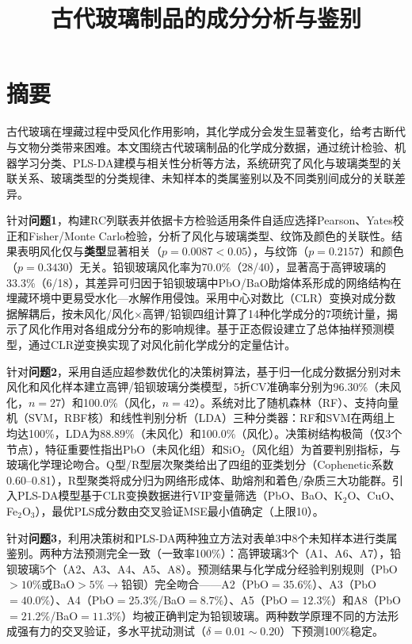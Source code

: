 \documentclass[12pt,a4paper]{ctexart}
\title{\vspace{-2.5cm}\textbf{古代玻璃制品的成分分析与鉴别}}
\author{}
\date{}
\begin{document}
\maketitle
\thispagestyle{empty}

\section*{摘\quad 要}
\thispagestyle{fancy}

古代玻璃在埋藏过程中受风化作用影响，其化学成分会发生显著变化，给考古断代与文物分类带来困难。本文围绕古代玻璃制品的化学成分数据，通过统计检验、机器学习分类、PLS-DA建模与相关性分析等方法，系统研究了风化与玻璃类型的关联关系、玻璃类型的分类规律、未知样本的类属鉴别以及不同类别间成分的关联差异。

针对\textbf{问题1}，构建RC列联表并依据卡方检验适用条件自适应选择Pearson、Yates校正和Fisher/Monte Carlo检验，分析了风化与玻璃类型、纹饰及颜色的关联性。结果表明风化仅与\textbf{类型}显著相关（$p=0.0087<0.05$），与纹饰（$p=0.2157$）和颜色（$p=0.3430$）无关。铅钡玻璃风化率为70.0\%（28/40），显著高于高钾玻璃的33.3\%（6/18），其差异可归因于铅钡玻璃中PbO/BaO助熔体系形成的网络结构在埋藏环境中更易受水化—水解作用侵蚀\cite{3}。采用中心对数比（CLR）变换对成分数据解耦后，按未风化/风化$\times$高钾/铅钡四组计算了14种化学成分的7项统计量，揭示了风化作用对各组成分分布的影响规律。基于正态假设建立了总体抽样预测模型，通过CLR逆变换实现了对风化前化学成分的定量估计。

针对\textbf{问题2}，采用自适应超参数优化的决策树算法，基于归一化成分数据分别对未风化和风化样本建立高钾/铅钡玻璃分类模型，5折CV准确率分别为96.30\%（未风化，$n=27$）和100.0\%（风化，$n=42$）。系统对比了随机森林（RF）、支持向量机（SVM，RBF核）和线性判别分析（LDA）三种分类器：RF和SVM在两组上均达100\%，LDA为88.89\%（未风化）和100.0\%（风化）。决策树结构极简（仅3个节点），特征重要性指出PbO（未风化组）和SiO$_2$（风化组）为首要判别指标，与玻璃化学理论吻合。Q型/R型层次聚类给出了四组的亚类划分（Cophenetic系数0.60--0.81），R型聚类将成分归为网络形成体、助熔剂和着色/杂质三大功能群。引入PLS-DA模型基于CLR变换数据进行VIP变量筛选（PbO、BaO、K$_2$O、CuO、Fe$_2$O$_3$），最优PLS成分数由交叉验证MSE最小值确定（上限10）。

针对\textbf{问题3}，利用决策树和PLS-DA两种独立方法对表单3中8个未知样本进行类属鉴别。两种方法预测完全一致（一致率100\%）：高钾玻璃3个（A1、A6、A7），铅钡玻璃5个（A2、A3、A4、A5、A8）。预测结果与化学成分经验判别规则（PbO$>10\%$或BaO$>5\%\rightarrow$铅钡\cite{1}）完全吻合——A2（PbO$=35.6\%$）、A3（PbO$=40.0\%$）、A4（PbO$=25.3\%$/BaO$=8.7\%$）、A5（PbO$=12.3\%$）和A8（PbO$=21.2\%$/BaO$=11.3\%$）均被正确判定为铅钡玻璃。两种数学原理不同的方法形成强有力的交叉验证，多水平扰动测试（$\delta=0.01\sim0.20$）下预测100\%稳定。
\end{document}
